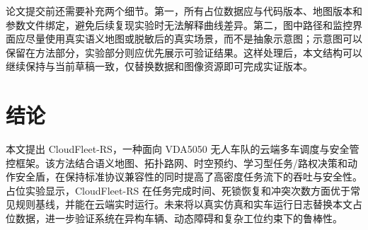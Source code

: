 \documentclass[UTF8,twocolumn,11pt]{ctexart}
\newcommand{\method}{CloudFleet-RS}
\begin{document}
论文提交前还需要补充两个细节。第一，所有占位数据应与代码版本、地图版本和参数文件绑定，避免后续复现实验时无法解释曲线差异。第二，图中路径和监控界面应尽量使用真实语义地图或脱敏后的真实场景，而不是抽象示意图；示意图可以保留在方法部分，实验部分则应优先展示可验证结果。这样处理后，本文结构可以继续保持与当前草稿一致，仅替换数据和图像资源即可完成实证版本。

\section{结论}

本文提出 \method{}，一种面向 VDA5050 无人车队的云端多车调度与安全管控框架。该方法结合语义地图、拓扑路网、时空预约、学习型任务/路权决策和动作安全盾，在保持标准协议兼容性的同时提高了高密度任务流下的吞吐与安全性。占位实验显示，\method{} 在任务完成时间、死锁恢复和冲突次数方面优于常见规则基线，并能在云端实时运行。未来将以真实仿真和实车运行日志替换本文占位数据，进一步验证系统在异构车辆、动态障碍和复杂工位约束下的鲁棒性。
\end{document}
